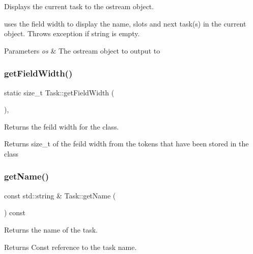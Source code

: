 Displays the current task to the ostream object. 

uses the field width to display the name, slots and next task(s) in the current object. Throws exception if string is empty. 
\begin{DoxyParams}{Parameters}
{\em os} & The ostream object to output to \\
\hline
\end{DoxyParams}
\mbox{\label{class_task_a18f265f8b4a37e5ed047034c2558068b}} 
\subsubsection{\texorpdfstring{get\+Field\+Width()}{getFieldWidth()}}
{\footnotesize\ttfamily static size\+\_\+t Task\+::get\+Field\+Width (\begin{DoxyParamCaption}{ }\end{DoxyParamCaption})\hspace{0.3cm}{\ttfamily [inline]}, {\ttfamily [static]}}



Returns the feild width for the class. 

\begin{DoxyReturn}{Returns}
size\+\_\+t of the feild width from the tokens that have been stored in the class 
\end{DoxyReturn}
\mbox{\label{class_task_a0c1ae0dd618c9b8ae35591040d3776f3}} 
\subsubsection{\texorpdfstring{get\+Name()}{getName()}}
{\footnotesize\ttfamily const std\+::string \& Task\+::get\+Name (\begin{DoxyParamCaption}{ }\end{DoxyParamCaption}) const}



Returns the name of the task. 

\begin{DoxyReturn}{Returns}
Const reference to the task name. 
\end{DoxyReturn}
\mbox{\label{class_task_acf6851078d506896872fa7cc6476e5bf}} 
